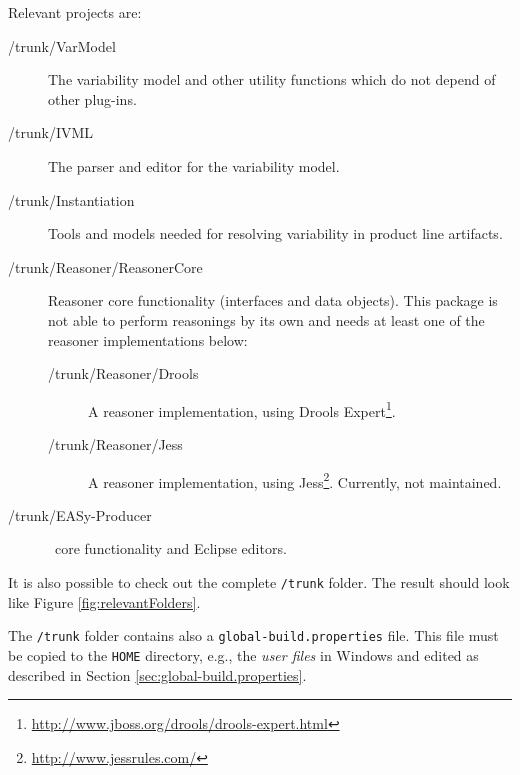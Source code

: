 Relevant projects are:
\begin{description}
	\item[/trunk/VarModel] $ $\\
		The variability model and other utility functions which do not depend of other plug-ins.
	\item[/trunk/IVML] $ $\\
		The parser and editor for the variability model.
	\item[/trunk/Instantiation] $ $\\
		Tools and models needed for resolving variability in product line artifacts.
	\item[/trunk/Reasoner/ReasonerCore] $ $\\
		Reasoner core functionality (interfaces and data objects). This package is not able to perform reasonings by its own and needs at least one of the reasoner implementations below:
	\begin{description}
		\item[/trunk/Reasoner/Drools] $ $\\
			A reasoner implementation, using Drools Expert\footnote{\url{http://www.jboss.org/drools/drools-expert.html}}.
		\item[/trunk/Reasoner/Jess] $ $\\
			A reasoner implementation, using Jess\footnote{\url{http://www.jessrules.com/}}. Currently, not maintained.
	\end{description}
	\item[/trunk/EASy-Producer] $ $\\
		\EASy\ core functionality and Eclipse editors.
\end{description}

It is also possible to check out the complete \texttt{/trunk} folder. The result should look like Figure \vref{fig:relevantFolders}.

\label{Copying global-build.properties}
The \texttt{/trunk} folder contains also a \texttt{global-build.properties} file. This file must be copied to the \texttt{HOME} directory, e.g., the \textit{user files} in Windows and edited as described in Section \vref{sec:global-build.properties}.


